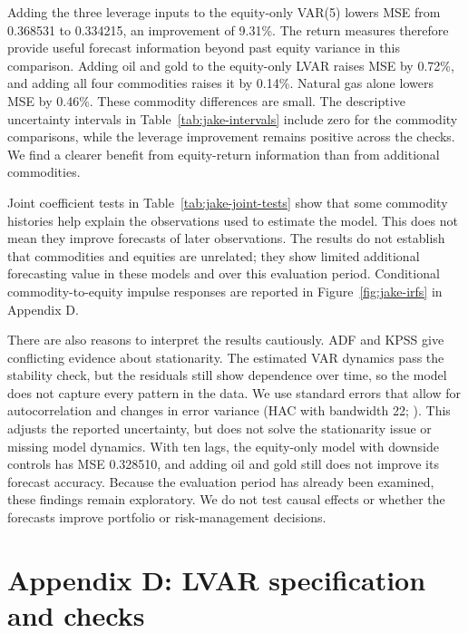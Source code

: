 \documentclass[11pt,a4paper]{article}
\begin{document}
Adding the three leverage inputs to the equity-only VAR(5) lowers MSE from 0.368531 to 0.334215, an improvement of 9.31\%. The return measures therefore provide useful forecast information beyond past equity variance in this comparison. Adding oil and gold to the equity-only LVAR raises MSE by 0.72\%, and adding all four commodities raises it by 0.14\%. Natural gas alone lowers MSE by 0.46\%. These commodity differences are small. The descriptive uncertainty intervals in Table~\ref{tab:jake-intervals} include zero for the commodity comparisons, while the leverage improvement remains positive across the checks. We find a clearer benefit from equity-return information than from additional commodities.

Joint coefficient tests in Table~\ref{tab:jake-joint-tests} show that some commodity histories help explain the observations used to estimate the model. This does not mean they improve forecasts of later observations. The results do not establish that commodities and equities are unrelated; they show limited additional forecasting value in these models and over this evaluation period. Conditional commodity-to-equity impulse responses are reported in Figure~\ref{fig:jake-irfs} in Appendix D.

There are also reasons to interpret the results cautiously. ADF and KPSS give conflicting evidence about stationarity. The estimated VAR dynamics pass the stability check, but the residuals still show dependence over time, so the model does not capture every pattern in the data. We use standard errors that allow for autocorrelation and changes in error variance (HAC with bandwidth 22; \citealp{newey-west}). This adjusts the reported uncertainty, but does not solve the stationarity issue or missing model dynamics. With ten lags, the equity-only model with downside controls has MSE 0.328510, and adding oil and gold still does not improve its forecast accuracy. Because the evaluation period has already been examined, these findings remain exploratory. We do not test causal effects or whether the forecasts improve portfolio or risk-management decisions.

\clearpage
\section*{Appendix D: LVAR specification and checks}
\setcounter{table}{0}
\setcounter{figure}{0}
\renewcommand{\thetable}{D\arabic{table}}
\renewcommand{\thefigure}{D\arabic{figure}}
\end{document}
